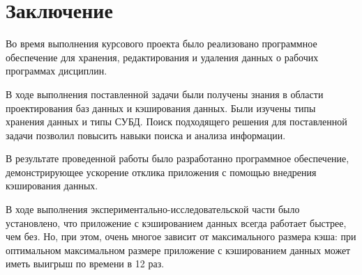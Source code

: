 \chapter*{Заключение}


Во время выполнения курсового проекта было реализовано программное обеспечение для хранения, редактирования и удаления данных о рабочих программах дисциплин.

В ходе выполнения поставленной задачи были получены знания в области проектирования баз данных и кэширования данных. Были изучены типы хранения данных и типы СУБД. Поиск подходящего решения для поставленной задачи позволил повысить навыки поиска и анализа информации.

В результате проведенной работы было разработанно программное обеспечение, демонстрирующее ускорение отклика приложения с помощью внедрения кэширования данных.

В ходе выполнения экспериментально-исследовательской части было установлено, что приложение с кэшированием данных всегда работает быстрее, чем без. Но, при этом, очень многое зависит от максимального размера кэша: при оптимальном максимальном размере приложение с кэшированием данных может иметь выигрыш по времени в 12 раз.